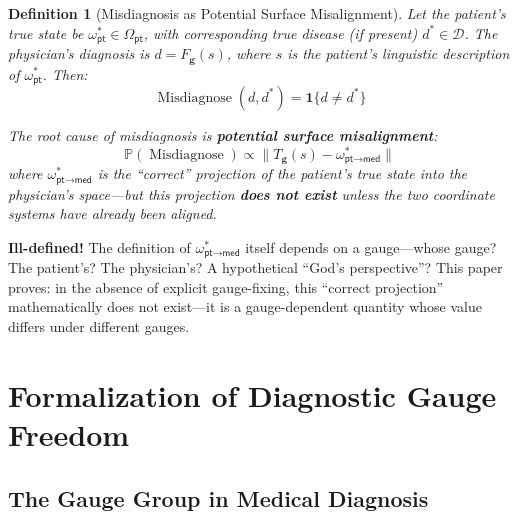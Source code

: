 \documentclass[12pt,a4paper]{article}
\newtheorem{definition}[theorem]{Definition}
\theoremstyle{remark}
\newcommand{\Pbb}{\mathbb{P}}
\newcommand{\med}{\textsf{med}}
\newcommand{\pt}{\textsf{pt}}
\DeclareMathOperator{\Misdiagnose}{Misdiagnose}
\begin{document}
\begin{definition}[Misdiagnosis as Potential Surface Misalignment]\label{def:misdiagnosis}
Let the patient's true state be $\omega_{\pt}^* \in \Omega_{\pt}$, with corresponding true disease (if present) $d^* \in \mathcal{D}$. The physician's diagnosis is $d = F_{\mathbf{g}}(s)$, where $s$ is the patient's linguistic description of $\omega_{\pt}^*$. Then:
\begin{equation}
    \Misdiagnose(d, d^*) = \mathbf{1}\{d \neq d^*\}
\end{equation}

The root cause of misdiagnosis is \textbf{potential surface misalignment}:
\begin{equation}
    \Pbb(\Misdiagnose) \propto \|T_{\mathbf{g}}(s) - \omega_{\pt \to \med}^*\|
\end{equation}
where $\omega_{\pt \to \med}^*$ is the ``correct'' projection of the patient's true state into the physician's space---but this projection \textbf{does not exist} unless the two coordinate systems have already been aligned.
\end{definition}

\textbf{Ill-defined!} The definition of $\omega_{\pt \to \med}^*$ itself depends on a gauge---whose gauge? The patient's? The physician's? A hypothetical ``God's perspective''? This paper proves: in the absence of explicit gauge-fixing, this ``correct projection'' mathematically does not exist---it is a gauge-dependent quantity whose value differs under different gauges.

\section{Formalization of Diagnostic Gauge Freedom}
\label{sec:gauge_formal}

\subsection{The Gauge Group in Medical Diagnosis}
\end{document}
